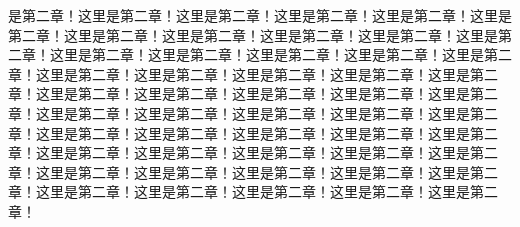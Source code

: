 是第二章！这里是第二章！这里是第二章！这里是第二章！这里是第二章！这里是第二章！这里是第二章！这里是第二章！这里是第二章！这里是第二章！这里是第二章！这里是第二章！这里是第二章！这里是第二章！这里是第二章！这里是第二章！这里是第二章！这里是第二章！这里是第二章！这里是第二章！这里是第二章！这里是第二章！这里是第二章！这里是第二章！这里是第二章！这里是第二章！这里是第二章！这里是第二章！这里是第二章！这里是第二章！这里是第二章！这里是第二章！这里是第二章！这里是第二章！这里是第二章！这里是第二章！这里是第二章！这里是第二章！这里是第二章！这里是第二章！这里是第二章！这里是第二章！这里是第二章！这里是第二章！这里是第二章！这里是第二章！这里是第二章！这里是第二章！这里是第二章！这里是第二章！这里是第二章！
